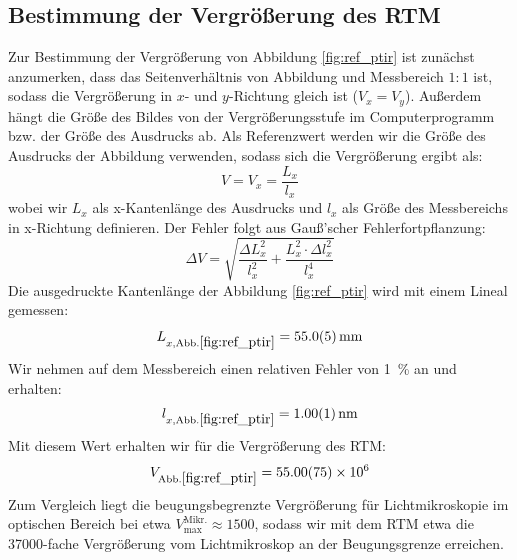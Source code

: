 \documentclass[10pt, a4paper]{article}
\begin{document}
\subsection{Bestimmung der Vergrößerung des RTM}
Zur Bestimmung der Vergrößerung von Abbildung \ref{fig:ref_ptir} ist zunächst anzumerken, dass das Seitenverhältnis von Abbildung und Messbereich $1:1$ ist, sodass die Vergrößerung in $x$- und $y$-Richtung gleich ist ($V_x = V_y$). Außerdem hängt die Größe des Bildes von der Vergrößerungsstufe im Computerprogramm bzw. der Größe des Ausdrucks ab. Als Referenzwert werden wir die Größe des Ausdrucks der Abbildung verwenden, sodass sich die Vergrößerung ergibt als:
\begin{equation}
  V = V_x = \frac{L_x}{l_x}
\end{equation}
wobei wir $L_x$ als x-Kantenlänge des Ausdrucks und $l_x$ als Größe des Messbereichs in x-Richtung definieren.
Der Fehler folgt aus Gauß'scher Fehlerfortpflanzung:
\begin{equation}
  \Delta V = \sqrt{\frac{\Delta L_x ^2}{l_x^2} + \frac{L_x^2 \cdot \Delta l_x^2}{l_x^4}}
\end{equation}
Die ausgedruckte Kantenlänge der Abbildung \ref{fig:ref_ptir} wird mit einem Lineal gemessen:
\begin{equation*}
  L_{x,\mathrm{Abb.\ref{fig:ref_ptir}}} = \SI{55 +- 0,5}{\milli\metre}
\end{equation*}
Wir nehmen auf dem Messbereich einen relativen Fehler von \SI{1}{\percent} an und erhalten:
\begin{align*}
  l_{x,\mathrm{Abb.\ref{fig:ref_ptir}}} = \SI{1,00 +- 0,01}{\nano\metre}
\end{align*}
Mit diesem Wert erhalten wir für die Vergrößerung des RTM:
\begin{align*}
  V_\mathrm{Abb.\ref{fig:ref_ptir}} = \num{55,0 +- 0,75e6}
\end{align*}
Zum Vergleich liegt die beugungsbegrenzte Vergrößerung für Lichtmikroskopie im optischen Bereich bei etwa $V_\mathrm{max}^\mathrm{Mikr.} \approx \num{1500}$, sodass wir mit dem RTM etwa die \num{37000}-fache Vergrößerung vom Lichtmikroskop an der Beugungsgrenze erreichen.
\end{document}
